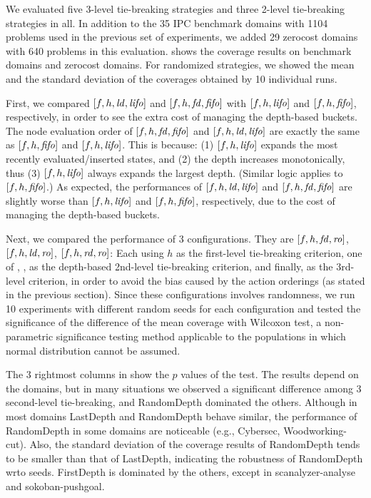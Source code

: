 We evaluated five 3-level tie-breaking strategies and three 2-level
tie-breaking strategies in all.
% 
In addition to the 35 IPC benchmark domains with 1104 problems used in
the previous set of experiments, we added 29 zerocost domains with 640
problems in this evaluation.   shows the coverage results
on benchmark domains and zerocost domains. For randomized strategies, we
showed the mean and the standard deviation of the coverages obtained by
10 individual runs.

First, we compared $[f,h,\mbox{\textit{ld}},\mbox{\textit{lifo}}]$ and $[f,h,\mbox{\textit{fd}},\mbox{\textit{fifo}}]$
with $[f,h,\mbox{\textit{lifo}}]$ and $[f,h,\mbox{\textit{fifo}}]$, respectively, in order to see
the extra cost of managing the depth-based buckets.
The node evaluation order of $[f,h,\mbox{\textit{fd}},\mbox{\textit{fifo}}]$ and $[f,h,\mbox{\textit{ld}},\mbox{\textit{lifo}}]$
are exactly the same as $[f,h,\mbox{\textit{fifo}}]$ and $[f,h,\mbox{\textit{lifo}}]$.
This is because:
(1) $[f,h,\mbox{\textit{lifo}}]$ expands the most recently evaluated/inserted
states, and (2) the depth increases monotonically,
thus (3) $[f,h,\mbox{\textit{lifo}}]$ always expands the largest depth. (Similar logic
applies to $[f,h,\mbox{\textit{fifo}}]$.)
% 
As expected, the performances of $[f,h,\mbox{\textit{ld}},\mbox{\textit{lifo}}]$ and
$[f,h,\mbox{\textit{fd}},\mbox{\textit{fifo}}]$ are slightly worse than $[f,h,\mbox{\textit{lifo}}]$ and
$[f,h,\mbox{\textit{fifo}}]$, respectively, due to the cost of managing the depth-based buckets.

Next, we compared the performance of 3 configurations.
They are $[f,h,\mbox{\textit{fd}},\mbox{\textit{ro}}]$, $[f,h,\mbox{\textit{ld}},\mbox{\textit{ro}}]$, $[f,h,\mbox{\textit{rd}},\mbox{\textit{ro}}]$: Each using
$h$ as the first-level tie-breaking criterion, one of \fd, \ld, \rd as
the depth-based 2nd-level tie-breaking criterion, and finally,
\ro as the 3rd-level criterion, in order to
avoid the bias caused by the action orderings (as stated in the previous
section).
Since these configurations involves randomness, we run 10
experiments with different random seeds for each configuration and
tested the significance of the difference of the mean coverage with Wilcoxon test,
a non-parametric significance testing method applicable to
the populations in which normal distribution cannot be assumed.

The 3 rightmost columns in  show the $p$ values of the
test. The results depend on the domains, but in many situations we
observed a significant difference among 3 second-level tie-breaking, and
RandomDepth dominated the others. Although in most domains LastDepth and
RandomDepth behave similar, the performance of RandomDepth in some
domains are noticeable (e.g., Cybersec, Woodworking-cut). Also, the
standard deviation of the coverage results of RandomDepth tends to be smaller
than that of LastDepth, indicating the robustness of RandomDepth wrto seeds.
FirstDepth is dominated by the others, except in scanalyzer-analyse
and sokoban-pushgoal.

